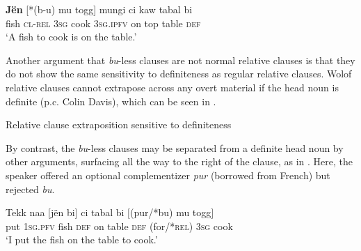 \documentclass[output=paper]{langscibook}
\begin{document}
\begin{exe}
	\ex \label{ex:newman:rel}
	\gll \textbf{J\"en} [*(b-u) mu togg] mungi ci kaw tabal bi \\
	fish \textsc{cl-rel} \textsc{3sg} cook \textsc{3sg.ipfv} on top table \textsc{def} \\
	\trans `A fish to cook is on the table.'
\end{exe}



Another argument that \emph{bu}-less clauses are not normal relative clauses is that they do not show the same sensitivity to definiteness as regular relative clauses. Wolof relative clauses cannot extrapose across any overt material if the head noun is definite (p.c. Colin Davis), which can be seen in . 

	\begin{exe}
		\ex \label{ex:newman:defrel} Relative clause extraposition sensitive to definiteness \begin{xlist}
		\end{xlist}
\end{exe}
	
By contrast, the \emph{bu}-less clauses may be separated from a definite head noun by other arguments, surfacing all the way to the right of the clause, as in . Here, the speaker offered an optional complementizer \emph{pur} (borrowed from French) but rejected \emph{bu}.
	
\begin{exe}
	\ex \label{ex:newman:extra}
	\gll Tekk naa $[$j\"en bi$]$ ci tabal bi $[$(pur/*bu) mu togg$]$ \\
	put \textsc{1sg.pfv} fish \textsc{def} on table \textsc{def} (for/*\textsc{rel}) \textsc{3sg} cook \\
	\trans `I put the fish on the table to cook.'
\end{exe}
\end{document}
